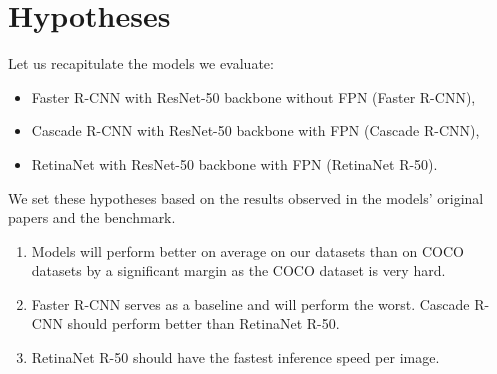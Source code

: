 \section{Hypotheses}
Let us recapitulate the models we evaluate:
\begin{itemize}
	\item Faster R-CNN with ResNet-50 backbone without FPN (Faster R-CNN),
	\item Cascade R-CNN with ResNet-50 backbone with FPN (Cascade R-CNN),
	\item RetinaNet with ResNet-50 backbone with FPN (RetinaNet R-50).
\end{itemize}
We set these hypotheses based on the results observed in the models' original
papers and the  benchmark.
\renewcommand{\theenumi}{\alph{enumi}}
\begin{enumerate}
	\item Models will perform better on average on our datasets than on COCO
	      datasets by a significant margin as the COCO dataset is very hard.
	\item Faster R-CNN serves as a baseline and will perform the worst. Cascade
	      R-CNN should perform better than RetinaNet R-50.
	\item RetinaNet R-50 should have the fastest inference speed per image.
\end{enumerate}


